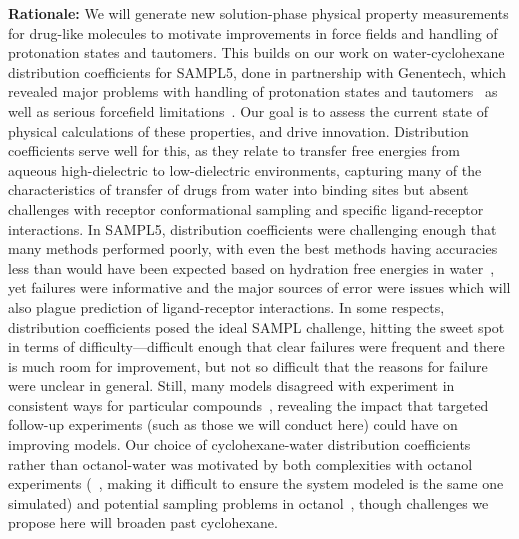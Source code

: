 \documentclass[11pt]{article}
\begin{document}
{\bf Rationale:}
We will generate new solution-phase physical property measurements for drug-like molecules to motivate improvements in force fields and handling of protonation states and tautomers.
This builds on our work on water-cyclohexane distribution coefficients for SAMPL5, done in partnership with Genentech, which revealed major problems with handling of protonation states and tautomers~\cite{bannan_blind_2016}  as well as serious forcefield limitations~\cite{paranahewage_predicting_2016}.
Our goal is to assess the current state of physical calculations of these properties, and drive innovation. 
Distribution coefficients serve well for this, as they relate to transfer free energies from aqueous high-dielectric to low-dielectric environments, capturing many of the characteristics of transfer of drugs from water into binding sites but absent challenges with receptor conformational sampling and specific ligand-receptor interactions.
In SAMPL5, distribution coefficients were challenging enough that many methods performed poorly, with even the best methods having accuracies less than would have been expected based on hydration free energies in water~\cite{bannan_blind_2016}, yet failures were informative and the major sources of error were issues which will also plague prediction of ligand-receptor interactions.
In some respects, distribution coefficients posed the ideal SAMPL challenge, hitting the sweet spot in terms of difficulty---difficult enough that clear failures were frequent and there is much room for improvement, but not so difficult that the reasons for failure were unclear in general. 
Still, many models disagreed with experiment in consistent ways for particular compounds~\cite{paranahewage_predicting_2016, klamt_prediction_2016, bannan_blind_2016, rustenburg_measuring_2016}, revealing the impact that targeted follow-up experiments (such as those we will conduct here) could have on improving  models.
Our choice of cyclohexane-water distribution coefficients rather than octanol-water was motivated by both complexities with octanol experiments (~\cite{bannan_calculating_2016}, making it difficult to ensure the system modeled is the same one simulated) and potential sampling problems in octanol~\cite{Kollman:1996:AccountsofChemicalResearch}, though challenges we propose here will broaden past cyclohexane.
\end{document}
